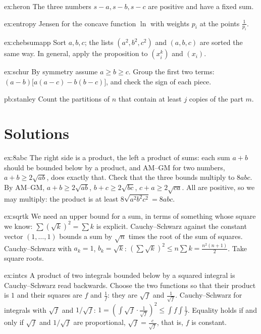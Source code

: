 \begin{hint}{ex:heron}
The three numbers $s-a,s-b,s-c$ are positive and have a fixed sum.
\end{hint}
\begin{hint}{ex:entropy}
Jensen for the concave function $\ln$ with weights $p_i$ at the points $\frac1{p_i}$.
\end{hint}
\begin{hint}{ex:chebsumapp}
Sort $a,b,c$; the lists $(a^2,b^2,c^2)$ and $(a,b,c)$ are sorted the same way. In general, apply the proposition to $(x_i^k)$ and $(x_i)$.
\end{hint}
\begin{hint}{ex:schur}
By symmetry assume $a\ge b\ge c$. Group the first two terms: $(a-b)\bigl[a(a-c)-b(b-c)\bigr]$, and check the sign of each piece.
\end{hint}

\begin{hint}{pb:stanley}
Count the partitions of $n$ that contain at least $j$ copies of the part $m$.
\end{hint}

\section{Solutions}

\begin{solution}{ex:8abc}
\idea The right side is a product, the left a product of sums: each sum $a+b$ should be bounded below by a product, and AM--GM for two numbers, $a+b\ge2\sqrt{ab}$, does exactly that. Check that the three bounds multiply to $8abc$.
\writeup By AM--GM, $a+b\ge2\sqrt{ab}$, $b+c\ge2\sqrt{bc}$, $c+a\ge2\sqrt{ca}$. All are positive, so we may multiply: the product is at least $8\sqrt{a^2b^2c^2}=8abc$.
\end{solution}

\begin{solution}{ex:sqrtk}
\idea We need an upper bound for a sum, in terms of something whose square we know: $\sum(\sqrt k)^2=\sum k$ is explicit. Cauchy--Schwarz against the constant vector $(1,\dots,1)$ bounds a sum by $\sqrt n$ times the root of the sum of squares.
\writeup Cauchy--Schwarz with $a_k=1$, $b_k=\sqrt k$: $\left(\sum\sqrt k\right)^2\le n\sum k=\frac{n^2(n+1)}2$. Take square roots.
\end{solution}

\begin{solution}{ex:intcs}
\idea A product of two integrals bounded below by a squared integral is Cauchy--Schwarz read backwards. Choose the two functions so that their product is $1$ and their squares are $f$ and $\frac1f$: they are $\sqrt f$ and $\frac1{\sqrt f}$.
\writeup Cauchy--Schwarz for integrals with $\sqrt f$ and $1/\sqrt f$: $1=\left(\int\sqrt f\cdot\frac1{\sqrt f}\right)^2\le\int f\int\frac1f$.
Equality holds if and only if $\sqrt f$ and $1/\sqrt f$ are proportional, $\sqrt f=\frac c{\sqrt f}$, that is, $f$ is constant.
\end{solution}

